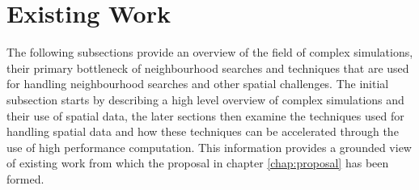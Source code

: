 \chapter{Existing Work\label{chap:literature}}
  The following subsections provide an overview of the field of complex simulations, their primary bottleneck of neighbourhood searches and techniques that are used for handling neighbourhood searches and other spatial challenges. The initial subsection starts by describing a high level overview of complex simulations and their use of spatial data, the later sections then examine the techniques used for handling spatial data and how these techniques can be accelerated through the use of high performance computation. This information provides a grounded view of existing work from which the proposal in chapter \ref{chap:proposal} has been formed. %
  
  
  
  
  
  
  
